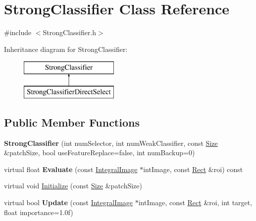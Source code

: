 \hypertarget{classStrongClassifier}{}\section{Strong\+Classifier Class Reference}
\label{classStrongClassifier}


{\ttfamily \#include $<$Strong\+Classifier.\+h$>$}

Inheritance diagram for Strong\+Classifier\+:\begin{figure}[H]
\begin{center}
\leavevmode
\includegraphics[height=2.000000cm]{classStrongClassifier}
\end{center}
\end{figure}
\subsection*{Public Member Functions}
\begin{DoxyCompactItemize}
\item 
\hypertarget{classStrongClassifier_a98f65a1c2088937ce66f08dc710b178a}{}{\bfseries Strong\+Classifier} (int num\+Selector, int num\+Weak\+Classifier, const \hyperlink{classSize}{Size} \&patch\+Size, bool use\+Feature\+Replace=false, int num\+Backup=0)\label{classStrongClassifier_a98f65a1c2088937ce66f08dc710b178a}

\item 
\hypertarget{classStrongClassifier_a7f2079d46afe7a49cef73a1d8b5fc61d}{}virtual float {\bfseries Evaluate} (const \hyperlink{classIntegralImage}{Integral\+Image} $\ast$int\+Image, const \hyperlink{classRect}{Rect} \&roi) const \label{classStrongClassifier_a7f2079d46afe7a49cef73a1d8b5fc61d}

\item 
virtual void \hyperlink{classStrongClassifier_a4ed37fe7ac50781e4d6ee6271d47731c}{Initialize} (const \hyperlink{classSize}{Size} \&patch\+Size)
\item 
\hypertarget{classStrongClassifier_ac6515ad2049961798844049c3ba1e2d6}{}virtual bool {\bfseries Update} (const \hyperlink{classIntegralImage}{Integral\+Image} $\ast$int\+Image, const \hyperlink{classRect}{Rect} \&roi, int target, float importance=1.\+0f)\label{classStrongClassifier_ac6515ad2049961798844049c3ba1e2d6}

\end{DoxyCompactItemize}
